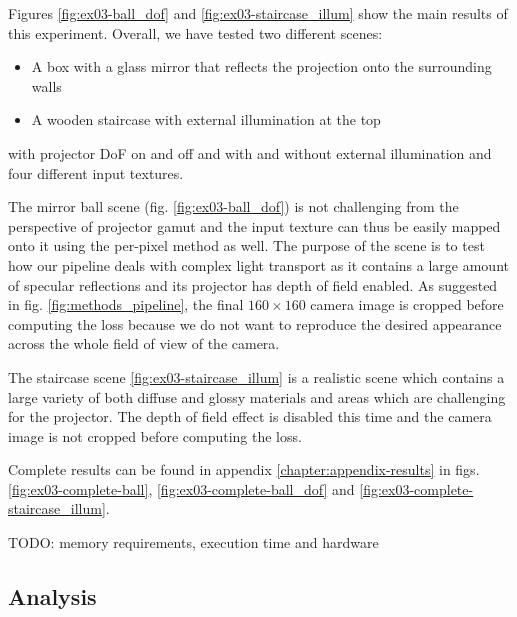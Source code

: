 Figures \ref{fig:ex03-ball_dof} and \ref{fig:ex03-staircase_illum} show the main results of this experiment. Overall, we have tested two different scenes:

\begin{itemize}
    \item A box with a glass mirror that reflects the projection onto the surrounding walls
    \item A wooden staircase with external illumination at the top
\end{itemize}

with projector DoF on and off and with and without external illumination and four different input textures.

The mirror ball scene (fig. \ref{fig:ex03-ball_dof}) is not challenging from the perspective of projector gamut and the input texture can thus be easily mapped onto it using the per-pixel method as well. The purpose of the scene is to test how our pipeline deals with complex light transport as it contains a large amount of specular reflections and its projector has depth of field enabled. As suggested in fig. \ref{fig:methods_pipeline}, the final \(160 \times 160\) camera image is cropped before computing the loss because we do not want to reproduce the desired appearance across the whole field of view of the camera.

The staircase scene \ref{fig:ex03-staircase_illum} is a realistic scene which contains a large variety of both diffuse and glossy materials and areas which are challenging for the projector. The depth of field effect is disabled this time and the camera image is not cropped before computing the loss.

Complete results can be found in appendix \ref{chapter:appendix-results} in figs. \ref{fig:ex03-complete-ball}, \ref{fig:ex03-complete-ball_dof} and \ref{fig:ex03-complete-staircase_illum}.

{\color{red} TODO: memory requirements, execution time and hardware}

\subsection{Analysis}
\label{section:results-experiments-03-analysis}

